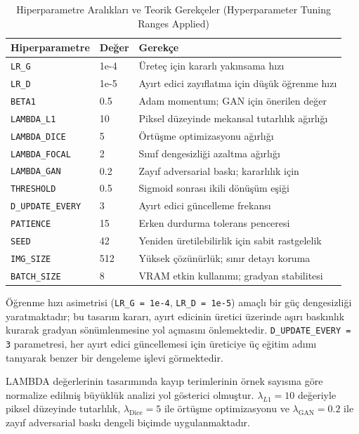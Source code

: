 \documentclass[10pt,journal,compsoc]{IEEEtran}
\begin{document}
\begin{table}[htbp]
\centering
\caption{Hiperparametre Aralıkları ve Teorik Gerekçeler \textnormal{\small{(Hyperparameter Tuning Ranges Applied)}}}
\label{tab:hyperparams}
\setlength{\tabcolsep}{3pt}
\begin{tabular}{@{}p{2.2cm}p{1.3cm}p{4.0cm}@{}}
\toprule
\textbf{Hiperparametre} & \textbf{Değer} & \textbf{Gerekçe} \\
\midrule
\texttt{LR\_G} & 1e-4 & Üreteç için kararlı yakınsama hızı \\
\texttt{LR\_D} & 1e-5 & Ayırt edici zayıflatma için düşük öğrenme hızı \\
\texttt{BETA1} & 0.5 & Adam momentum; GAN için önerilen değer \\
\texttt{LAMBDA\_L1} & 10 & Piksel düzeyinde mekansal tutarlılık ağırlığı \\
\texttt{LAMBDA\_DICE} & 5 & Örtüşme optimizasyonu ağırlığı \\
\texttt{LAMBDA\_FOCAL} & 2 & Sınıf dengesizliği azaltma ağırlığı \\
\texttt{LAMBDA\_GAN} & 0.2 & Zayıf adversarial baskı; kararlılık için \\
\texttt{THRESHOLD} & 0.5 & Sigmoid sonrası ikili dönüşüm eşiği \\
\texttt{D\_UPDATE\_EVERY} & 3 & Ayırt edici güncelleme frekansı \\
\texttt{PATIENCE} & 15 & Erken durdurma tolerans penceresi \\
\texttt{SEED} & 42 & Yeniden üretilebilirlik için sabit rastgelelik \\
\texttt{IMG\_SIZE} & 512 & Yüksek çözünürlük; sınır detayı koruma \\
\texttt{BATCH\_SIZE} & 8 & VRAM etkin kullanımı; gradyan stabilitesi \\
\bottomrule
\end{tabular}
\end{table}

Öğrenme hızı asimetrisi (\texttt{LR\_G = 1e-4}, \texttt{LR\_D = 1e-5}) amaçlı bir güç dengesizliği yaratmaktadır; bu tasarım kararı, ayırt edicinin üretici üzerinde aşırı baskınlık kurarak gradyan sönümlenmesine yol açmasını önlemektedir. \texttt{D\_UPDATE\_EVERY = 3} parametresi, her ayırt edici güncellemesi için üreticiye üç eğitim adımı tanıyarak benzer bir dengeleme işlevi görmektedir.

LAMBDA değerlerinin tasarımında kayıp terimlerinin örnek sayısına göre normalize edilmiş büyüklük analizi yol gösterici olmuştur. $\lambda_{L1}=10$ değeriyle piksel düzeyinde tutarlılık, $\lambda_{\text{Dice}}=5$ ile örtüşme optimizasyonu ve $\lambda_{\text{GAN}}=0.2$ ile zayıf adversarial baskı dengeli biçimde uygulanmaktadır.
\end{document}
